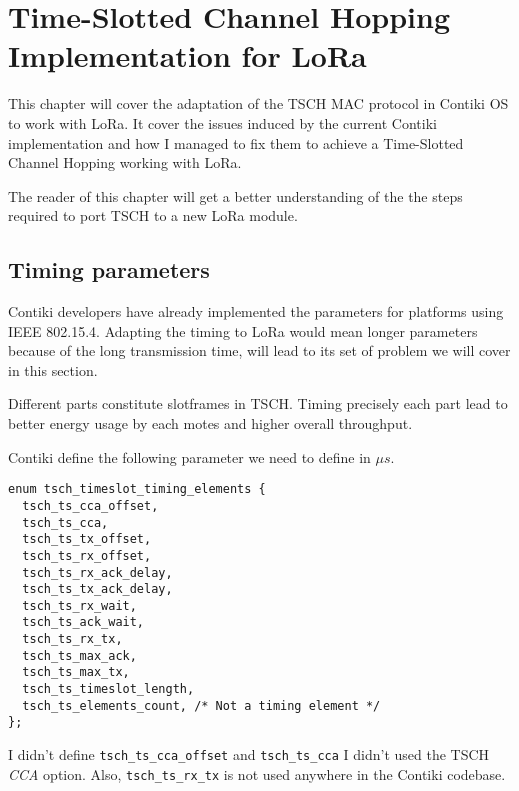 \chapter{Time-Slotted Channel Hopping Implementation for LoRa\label{section:tsch}}

This chapter will cover the adaptation of the TSCH MAC protocol in Contiki OS to
work with LoRa.
It cover the issues induced by the current Contiki implementation and how I
managed to fix them to achieve a Time-Slotted Channel Hopping working with LoRa.

The reader of this chapter will get a better understanding of the the steps
required to port TSCH to a new LoRa module.

\section{Timing parameters}

Contiki developers have already implemented the parameters for
platforms using IEEE 802.15.4.
Adapting the timing to LoRa would mean longer parameters because of the long
transmission time, will lead to its set of problem we will cover in this
section.

Different parts constitute slotframes in TSCH. Timing precisely each part lead
to better energy usage by each motes and higher overall throughput.

Contiki define the following parameter we need to define in $\mu s$.

\begin{lstlisting}
enum tsch_timeslot_timing_elements {
  tsch_ts_cca_offset,
  tsch_ts_cca,
  tsch_ts_tx_offset,
  tsch_ts_rx_offset,
  tsch_ts_rx_ack_delay,
  tsch_ts_tx_ack_delay,
  tsch_ts_rx_wait,
  tsch_ts_ack_wait,
  tsch_ts_rx_tx,
  tsch_ts_max_ack,
  tsch_ts_max_tx,
  tsch_ts_timeslot_length,
  tsch_ts_elements_count, /* Not a timing element */
};
\end{lstlisting}

I didn't define \lstinline{tsch_ts_cca_offset} and \lstinline{tsch_ts_cca} I
didn't used the TSCH \emph{CCA} option.
Also, \lstinline{tsch_ts_rx_tx} is not used anywhere in the Contiki codebase.


